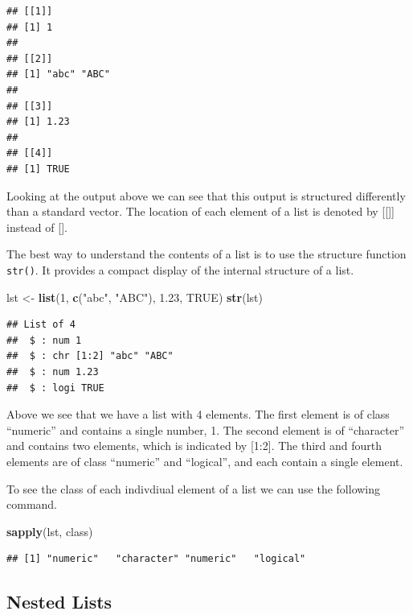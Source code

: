 \documentclass[
]{book}
\newenvironment{Shaded}{\begin{snugshade}}{\end{snugshade}}
\newcommand{\DecValTok}[1]{\textcolor[rgb]{0.00,0.00,0.81}{#1}}
\newcommand{\FloatTok}[1]{\textcolor[rgb]{0.00,0.00,0.81}{#1}}
\newcommand{\KeywordTok}[1]{\textcolor[rgb]{0.13,0.29,0.53}{\textbf{#1}}}
\newcommand{\NormalTok}[1]{#1}
\newcommand{\OtherTok}[1]{\textcolor[rgb]{0.56,0.35,0.01}{#1}}
\newcommand{\StringTok}[1]{\textcolor[rgb]{0.31,0.60,0.02}{#1}}
\begin{document}
\begin{verbatim}
## [[1]]
## [1] 1
## 
## [[2]]
## [1] "abc" "ABC"
## 
## [[3]]
## [1] 1.23
## 
## [[4]]
## [1] TRUE
\end{verbatim}

Looking at the output above we can see that this output is structured differently than a standard vector. The location of each element of a list is denoted by {[}{[}{]}{]} instead of {[}{]}.

The best way to understand the contents of a list is to use the structure function \texttt{str()}. It provides a compact display of the internal structure of a list.

\begin{Shaded}
\begin{Highlighting}[]
\NormalTok{lst <-}\StringTok{ }\KeywordTok{list}\NormalTok{(}\DecValTok{1}\NormalTok{, }\KeywordTok{c}\NormalTok{(}\StringTok{"abc"}\NormalTok{,}
    \StringTok{"ABC"}\NormalTok{), }\FloatTok{1.23}\NormalTok{, }\OtherTok{TRUE}\NormalTok{)}
\KeywordTok{str}\NormalTok{(lst)}
\end{Highlighting}
\end{Shaded}

\begin{verbatim}
## List of 4
##  $ : num 1
##  $ : chr [1:2] "abc" "ABC"
##  $ : num 1.23
##  $ : logi TRUE
\end{verbatim}

Above we see that we have a list with 4 elements. The first element is of class ``numeric'' and contains a single number, 1. The second element is of ``character'' and contains two elements, which is indicated by {[}1:2{]}. The third and fourth elements are of class ``numeric'' and ``logical'', and each contain a single element.

To see the class of each indivdiual element of a list we can use the following command.

\begin{Shaded}
\begin{Highlighting}[]
\KeywordTok{sapply}\NormalTok{(lst, class)}
\end{Highlighting}
\end{Shaded}

\begin{verbatim}
## [1] "numeric"   "character" "numeric"   "logical"
\end{verbatim}

\hypertarget{nested-lists}{%
\subsection{Nested Lists}\label{nested-lists}}
\end{document}
